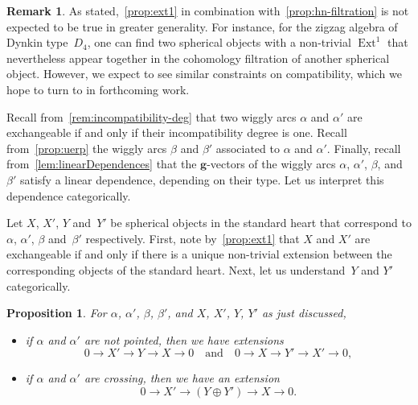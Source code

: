 \documentclass{amsart}
\newtheorem{proposition}[theorem]{Proposition}
\theoremstyle{definition}
\newtheorem{remark}[theorem]{Remark}
\renewcommand{\b}[1]{{\boldsymbol{#1}}} %
\DeclareMathOperator{\Ext}{Ext} %
\begin{document}
\begin{remark}
  As stated,~\cref{prop:ext1} in combination with~\cref{prop:hn-filtration} is not expected to be true in greater generality.
  For instance, for the zigzag algebra of Dynkin type~\(D_4\), one can find two spherical objects with a non-trivial \(\Ext^1\) that nevertheless appear together in the cohomology filtration of another spherical object.
  However, we expect to see similar constraints on compatibility, which we hope to turn to in forthcoming work.
\end{remark}

\pagebreak
Recall from~\cref{rem:incompatibility-deg} that two wiggly arcs \(\alpha\) and \(\alpha'\) are exchangeable if and only if their incompatibility degree is one.
Recall from~\cref{prop:uerp} the wiggly arcs \(\beta\) and \(\beta'\) associated to \(\alpha\) and \(\alpha'\).
Finally, recall from~\cref{lem:linearDependences} that the \(\b{g}\)-vectors of the wiggly arcs \(\alpha\), \(\alpha'\), \(\beta\), and \(\beta'\) satisfy a linear dependence, depending on their type.
Let us interpret this dependence categorically.

Let \(X\), \(X'\), \(Y\) and~\(Y'\) be spherical objects in the standard heart that correspond to \(\alpha\), \(\alpha'\), \(\beta\) and~\(\beta'\) respectively.
First, note by~\cref{prop:ext1} that \(X\) and \(X'\) are exchangeable if and only if there is a unique non-trivial extension between the corresponding objects of the standard heart.
Next, let us understand~\(Y\) and \(Y'\) categorically.

\begin{proposition}\label{prop:extensions}
For \(\alpha\), \(\alpha'\), \(\beta\), \(\beta'\), and \(X\), \(X'\), \(Y\), \(Y'\) as just discussed,
\begin{itemize}
\item if \(\alpha\) and \(\alpha'\) are not pointed, then we have extensions
  \[0 \to X' \to Y \to X \to 0 \quad \text{and}\quad 0 \to X \to Y' \to X' \to 0,\]
\item if \(\alpha\) and \(\alpha'\) are crossing, then we have an extension
  \[0 \to X' \to (Y \oplus Y') \to X \to 0.\]
\end{itemize}
\end{proposition}
\end{document}
